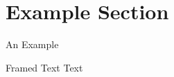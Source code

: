 \section{Example Section}
\begin{frame}{An Example}
\begin{block}{Framed Text}
Text \insertsectionhead
\end{block}
\end{frame}